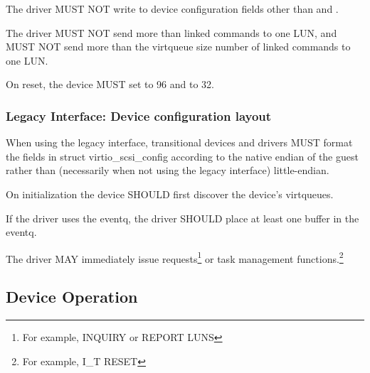 
The driver MUST NOT write to device configuration fields other than
 and .

The driver MUST NOT send more than  linked commands
to one LUN, and MUST NOT send more than the virtqueue size number of
linked commands to one LUN.


On reset, the device MUST set  to 96 and
 to 32.

\subsubsection{Legacy Interface: Device configuration layout}\label{sec:Device Types / SCSI Host Device / Device configuration layout / Legacy Interface: Device configuration layout}
When using the legacy interface, transitional devices and drivers
MUST format the fields in struct virtio_scsi_config
according to the native endian of the guest rather than
(necessarily when not using the legacy interface) little-endian.


On initialization the device SHOULD first discover the
device's virtqueues.

If the driver uses the eventq, the driver SHOULD place at least one
buffer in the eventq.

The driver MAY immediately issue requests\footnote{For example, INQUIRY
or REPORT LUNS} or task management functions.\footnote{For example, I_T
RESET}

\subsection{Device Operation}\label{sec:Device Types / SCSI Host Device / Device Operation}

